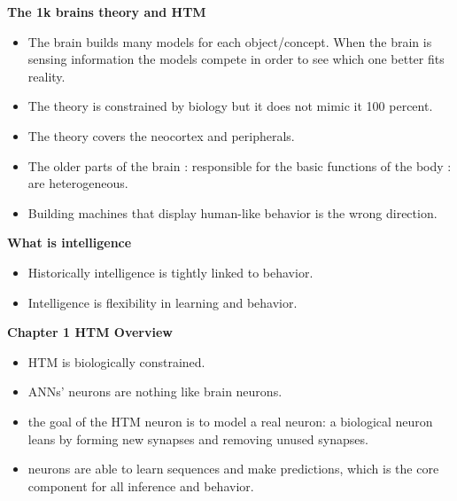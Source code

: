 \documentclass{article}
\begin{document}
\textbf{The 1k brains theory and HTM}
\begin{itemize}
\item The brain builds many models for each object/concept. When the brain is sensing information the models compete in order to see which one better fits reality. 
\item The theory is constrained by biology but it does not mimic it 100 percent.
\item The theory covers the neocortex and peripherals.
\item The older parts of the brain : responsible for the basic functions of the body : are heterogeneous.
\item Building machines that display human-like behavior is the wrong direction.
\end{itemize}

\textbf{What is intelligence}
\begin{itemize}
\item Historically intelligence is tightly linked to behavior.
\item Intelligence is flexibility in learning and behavior.
\end{itemize}

\textbf{Chapter 1 HTM Overview}
\begin{itemize}
\item HTM is biologically constrained.
\item ANNs' neurons are nothing like brain neurons.
\item the goal of the HTM neuron is to model a real neuron: a biological neuron leans by forming new synapses and removing unused synapses.
\item neurons are able to learn sequences and make predictions, which is the core component for all inference and behavior.
\end{itemize}
\end{document}
